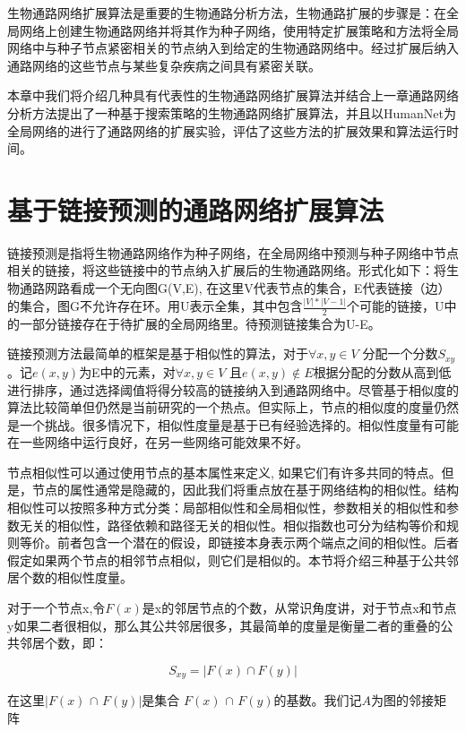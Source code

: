 生物通路网络扩展算法是重要的生物通路分析方法，生物通路扩展的步骤是：在全局网络上创建生物通路网络并将其作为种子网络，使用特定扩展策略和方法将全局网络中与种子节点紧密相关的节点纳入到给定的生物通路网络中。经过扩展后纳入通路网络的这些节点与某些复杂疾病之间具有紧密关联。

本章中我们将介绍几种具有代表性的生物通路网络扩展算法并结合上一章通路网络分析方法提出了一种基于搜索策略的生物通路网络扩展算法，并且以HumanNet为全局网络的进行了通路网络的扩展实验，评估了这些方法的扩展效果和算法运行时间。

\section{基于链接预测的通路网络扩展算法}
链接预测是指将生物通路网络作为种子网络，在全局网络中预测与种子网络中节点相关的链接，将这些链接中的节点纳入扩展后的生物通路网络。形式化如下：将生物通路网路看成一个无向图G(V,E), 在这里V代表节点的集合，E代表链接（边）的集合，图G不允许存在环。用U表示全集，其中包含$\frac{|V|*|V-1|}{2}$个可能的链接，U中的一部分链接存在于待扩展的全局网络里。待预测链接集合为U-E。

链接预测方法最简单的框架是基于相似性的算法，对于$\forall x,y\in V$ 分配一个分数$S_{xy}$。记$e(x,y)$为E中的元素，对$\forall x,y\in V$ 且$e(x,y) \notin E$根据分配的分数从高到低进行排序，通过选择阈值将得分较高的链接纳入到通路网络中。尽管基于相似度的算法比较简单但仍然是当前研究的一个热点。但实际上，节点的相似度的度量仍然是一个挑战。很多情况下，相似性度量是基于已有经验选择的。相似性度量有可能在一些网络中运行良好，在另一些网络可能效果不好\cite{lu2011link}。

节点相似性可以通过使用节点的基本属性来定义, 如果它们有许多共同的特点。但是，节点的属性通常是隐藏的，因此我们将重点放在基于网络结构的相似性。结构相似性可以按照多种方式分类：局部相似性和全局相似性，参数相关的相似性和参数无关的相似性，路径依赖和路径无关的相似性。相似指数也可分为结构等价和规则等价。前者包含一个潜在的假设，即链接本身表示两个端点之间的相似性。后者假定如果两个节点的相邻节点相似，则它们是相似的。本节将介绍三种基于公共邻居个数的相似性度量。

对于一个节点x,令$F(x)$是x的邻居节点的个数，从常识角度讲，对于节点x和节点y如果二者很相似，那么其公共邻居很多，其最简单的度量是衡量二者的重叠的公共邻居个数，即：

\begin{equation}
	S_{xy} = |F(x) \cap F(y)|
	\label{eq31}
\end{equation}

在这里$|F(x)$ $\cap$ $F(y)|$是集合  $F(x)$ $\cap$ $F(y)$的基数。我们记$A$为图的邻接矩阵

